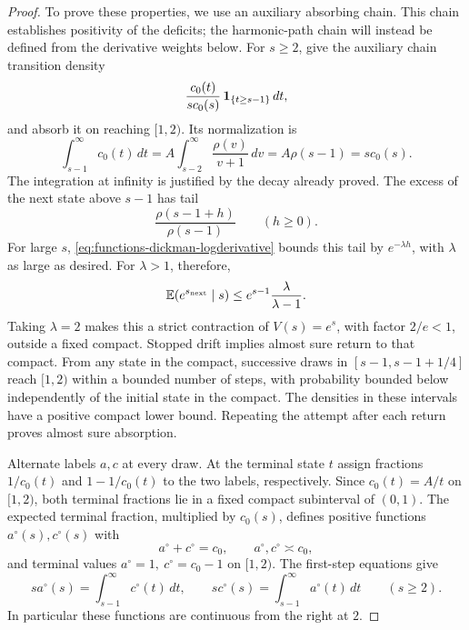 \begin{proof}
To prove these properties, we use an auxiliary absorbing chain.  This
chain establishes positivity of the deficits; the harmonic-path chain
will instead be defined from the derivative weights below.
For \(s\ge2\), give the auxiliary chain transition density
\begin{equation}\label{eq:functions-auxiliary-kernel}
 \frac{c_0(t)}{s c_0(s)}\,\mathbf 1_{\{t\ge s-1\}}\,dt,
\end{equation}
and absorb it on reaching \([1,2)\).  Its normalization is
\[
 \int_{s-1}^{\infty}c_0(t)\,dt
 =A\int_{s-2}^{\infty}\frac{\rho(v)}{v+1}\,dv
 =A\rho(s-1)=s c_0(s).
\]
The integration at infinity is justified by the decay already proved.
The excess of the next state above \(s-1\) has tail
\[
 \frac{\rho(s-1+h)}{\rho(s-1)}\qquad(h\ge0).
\]
For large \(s\), \eqref{eq:functions-dickman-logderivative} bounds this
tail by \(e^{-\lambda h}\), with \(\lambda\) as large as desired.
For \(\lambda>1\), therefore,
\[
 \mathbb E(e^{s_{\rm next}}\mid s)
 \le e^{s-1}\frac{\lambda}{\lambda-1}.
\]
Taking \(\lambda=2\) makes this a strict contraction of \(V(s)=e^s\),
with factor \(2/e<1\), outside a fixed compact.
Stopped drift implies almost sure return to that compact.  From any
state in the compact, successive draws in
\([s-1,s-1+1/4]\) reach \([1,2)\) within a bounded number of steps,
with probability bounded below independently of the initial state
in the compact.  The densities in these intervals have a positive
compact lower bound.  Repeating the attempt after each return proves
almost sure absorption.

Alternate labels \(a,c\) at every draw.  At the terminal state \(t\)
assign fractions \(1/c_0(t)\) and \(1-1/c_0(t)\) to the two labels,
respectively.  Since \(c_0(t)=A/t\) on \([1,2)\), both terminal
fractions lie in a fixed compact subinterval of \((0,1)\).
The expected terminal fraction, multiplied by \(c_0(s)\), defines
positive functions \(a^\circ(s),c^\circ(s)\) with
\[
 a^\circ+c^\circ=c_0,\qquad
 a^\circ,c^\circ\asymp c_0,
\]
and terminal values \(a^\circ=1,\ c^\circ=c_0-1\) on \([1,2)\).
The first-step equations give
\[
 s a^\circ(s)=\int_{s-1}^{\infty}c^\circ(t)\,dt,\qquad
 s c^\circ(s)=\int_{s-1}^{\infty}a^\circ(t)\,dt
 \qquad(s\ge2).
\]
In particular these functions are continuous from the right at \(2\).


\end{proof}
